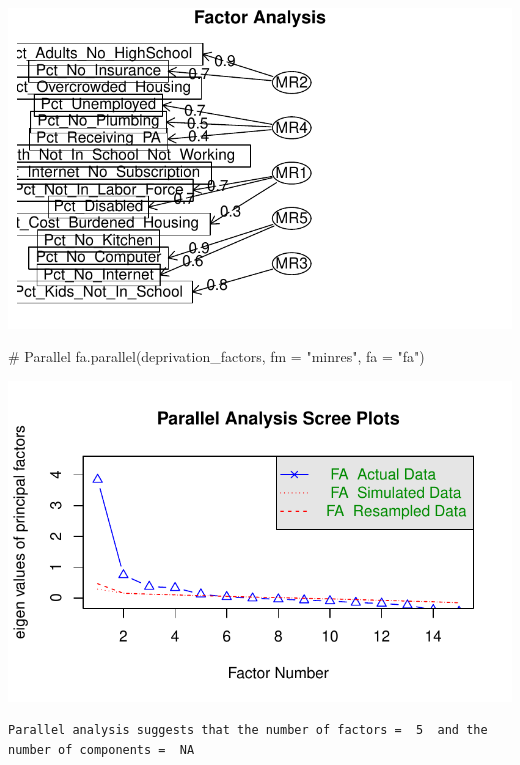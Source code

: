 \documentclass[
  letterpaper,
  DIV=11,
  numbers=noendperiod]{scrreprt}
\newenvironment{Shaded}{\begin{snugshade}}{\end{snugshade}}
\newcommand{\AttributeTok}[1]{\textcolor[rgb]{0.40,0.45,0.13}{#1}}
\newcommand{\CommentTok}[1]{\textcolor[rgb]{0.37,0.37,0.37}{#1}}
\newcommand{\FunctionTok}[1]{\textcolor[rgb]{0.28,0.35,0.67}{#1}}
\newcommand{\NormalTok}[1]{\textcolor[rgb]{0.00,0.23,0.31}{#1}}
\newcommand{\OtherTok}[1]{\textcolor[rgb]{0.00,0.23,0.31}{#1}}
\newcommand{\SpecialCharTok}[1]{\textcolor[rgb]{0.37,0.37,0.37}{#1}}
\newcommand{\StringTok}[1]{\textcolor[rgb]{0.13,0.47,0.30}{#1}}
\begin{document}
\includegraphics{multidimensional_poverty_files/figure-pdf/factor-1.pdf}

\begin{Shaded}
\begin{Highlighting}[]
\CommentTok{\# Parallel}
\FunctionTok{fa.parallel}\NormalTok{(deprivation\_factors, }\AttributeTok{fm =} \StringTok{"minres"}\NormalTok{, }\AttributeTok{fa =} \StringTok{"fa"}\NormalTok{)}
\end{Highlighting}
\end{Shaded}

\includegraphics{multidimensional_poverty_files/figure-pdf/factor-2.pdf}

\begin{verbatim}
Parallel analysis suggests that the number of factors =  5  and the number of components =  NA 
\end{verbatim}

\begin{Shaded}
\end{Shaded}
\end{document}
